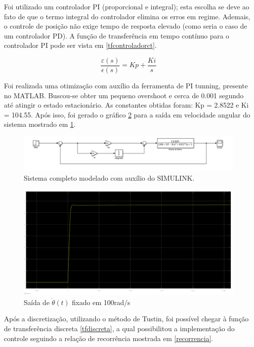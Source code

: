 \documentclass[a4paper,11pt]{article}
\begin{document}
		\newpage
		
		Foi utilizado um controlador PI (proporcional e integral); esta escolha se deve ao fato de que o termo integral do controlador elimina os erros em regime. Ademais, o controle de posição não exige tempo de resposta elevado (como seria o caso de um controlador PD). A função de transferência em tempo contínuo para o controlador PI pode ser vista em \ref{tfcontroladorct}.
		
		\begin{equation}
			\frac{\varepsilon(s)}{\epsilon(s)}= Kp + \frac{Ki}{s} \label{tfcontroladorct}
		\end{equation}
		
		Foi realizada uma otimização com auxílio da ferramenta de PI tunning, presente no MATLAB. Buscou-se obter um pequeno overshoot e cerca de 0.001 segundo até atingir o estado estacionário. As constantes obtidas foram: Kp = 2.8522 e Ki = 104.55. Após isso, foi gerado o gráfico \ref{fig:saidasimulada} para a saída em velocidade angular do sistema mostrado em \ref{fig:sistemasimulink}.
		
		\begin{figure}[ht]
			\centering
			\includegraphics[width=0.9\linewidth]{images/sistemaEControlador}
			\caption{Sistema completo modelado com auxílio do SIMULINK\cite{MATLAB}.}
			\label{fig:sistemasimulink}
		\end{figure}
	
		\begin{figure}[ht]
			\centering
			\includegraphics[width=0.7\linewidth]{images/sistemStep}
			\caption{Saída de $\dot{\theta}(t)$ fixado em 100rad/s}
			\label{fig:saidasimulada}
		\end{figure}
		
		Após a discretização, utilizando o método de Tustin, foi possível chegar à função de transferência discreta \ref{tfdiscreta}, a qual possibilitou a implementação do controle seguindo a relação de recorrência mostrada em \ref{recorrencia}.
		
\end{document}
